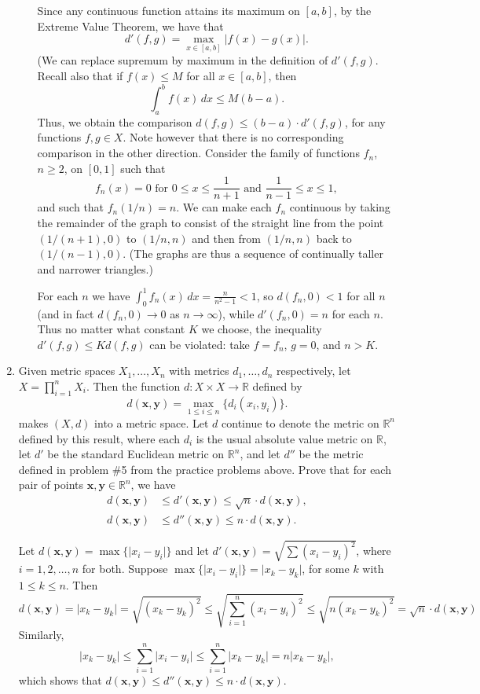 \documentclass[letterpaper,12pt]{article}
\newcommand{\abs}[1]{\lvert #1\rvert}
\newcommand{\R}{\mathbb{R}}
\newcommand{\x}{\mathbf{x}}
\newcommand{\y}{\mathbf{y}}
\begin{document}
\begin{enumerate}
\begin{enumerate}
Since any continuous function attains its maximum on $[a,b]$, by the Extreme Value Theorem, we have that
\[
 d'(f,g) = \max_{x\in [a,b]}\abs{f(x)-g(x)}.
\]
(We can replace supremum by maximum in the definition of $d'(f,g)$. Recall also that if $f(x)\leq M$ for all $x\in [a,b]$, then
\[
 \int_a^b f(x)\,dx \leq M(b-a).
\]
Thus, we obtain the comparison $d(f,g)\leq (b-a)\cdot d'(f,g)$, for any functions $f,g\in X$. Note however that there is no corresponding comparison in the other direction. Consider the family of functions $f_n$, $n\geq 2$, on $[0,1]$ such that
\[
 f_n(x) = 0 \text{ for } 0\leq x\leq \frac{1}{n+1} \text{ and } \frac{1}{n-1}\leq x\leq 1,
\]
and such that $f_n(1/n)=n$. We can make each $f_n$ continuous by taking the remainder of the graph to consist of the straight line from the point $(1/(n+1),0)$ to $(1/n,n)$ and then from $(1/n,n)$ back to $(1/(n-1),0)$. (The graphs are thus a sequence of continually taller and narrower triangles.)

For each $n$ we have $\displaystyle \int_0^1 f_n(x)\,dx = \frac{n}{n^2-1}<1$, so $d(f_n,0)<1$ for all $n$ (and in fact $d(f_n,0)\to 0$ as $n\to \infty$), while $d'(f_n,0) = n$ for each $n$. Thus no matter what constant $K$ we choose, the inequality $d'(f,g)\leq K d(f,g)$ can be violated: take $f=f_n$, $g=0$, and $n>K$.
\end{enumerate}
 \item Given metric spaces $X_1,\ldots, X_n$ with metrics $d_1,\ldots, d_n$ respectively, let $X = \prod_{i=1}^nX_i$. Then the function $d:X\times X\to \R$ defined by 
\[
 d(\x,\y) = \max_{1\leq i\leq n}\{d_i(x_i,y_i)\}.
\]
makes $(X,d)$ into a metric space. Let $d$ continue to denote the metric on $\R^n$ defined by this result, where each $d_i$ is the usual absolute value metric on $\R$, let $d'$ be the standard Euclidean metric on $\R^n$, and let $d''$ be the metric defined in problem \#5 from the practice problems above. Prove that for each pair of points $\x,\y\in\R^n$, we have
\begin{align*}
 d(\x,\y)&\leq d'(\x,\y)\leq \sqrt{n}\cdot d(\x,\y),\\
 d(\x,\y)&\leq d''(\x,\y)\leq n\cdot d(\x,\y).
\end{align*}

\bigskip

Let $d(\x,\y) = \max\{\abs{x_i-y_i}\}$ and let $d'(\x,\y) = \sqrt{\sum(x_i-y_i)^2}$, where $i=1,2,\ldots, n$ for both. Suppose $\max\{\abs{x_i-y_i}\} = \abs{x_k-y_k}$, for some $k$ with $1\leq k\leq n$. Then
\[
d(\x,\y) = \abs{x_k-y_k} = \sqrt{(x_k-y_k)^2}\leq \sqrt{\sum_{i=1}^n(x_i-y_i)^2} \leq \sqrt{n(x_k-y_k)^2}=\sqrt{n}\cdot d(\x,\y)
\]
Similarly, 
\[
 \abs{x_k-y_k}\leq \sum_{i=1}^n\abs{x_i-y_i}\leq \sum_{i=1}^n\abs{x_k-y_k} = n\abs{x_k-y_k},
\]
which shows that $d(\x,\y)\leq d''(\x,\y)\leq n\cdot d(\x,\y)$.


\end{enumerate}
\end{document}
